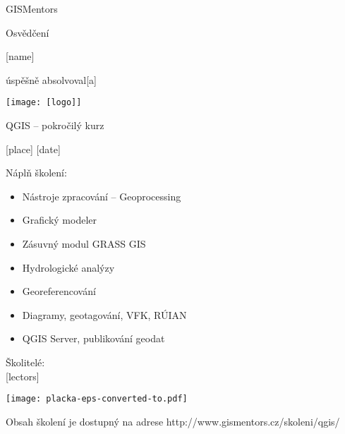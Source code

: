 \documentclass[12pt, a4paper]{letter}
\begin{document}
\pagestyle{empty}
\begin{center}

{\Large GISMentors}

{\Huge Osvědčení}

{\Large [name]}

úspěšně absolvoval[a]

\texttt{[image: [logo]]}

{\Large QGIS -- pokročilý kurz}

[place] [date]
\end{center}

Náplň školení:

\begin{itemize}
    \item Nástroje zpracování -- Geoprocessing
    \item Grafický modeler
    \item Zásuvný modul GRASS GIS
    \item Hydrologické analýzy
    \item Georeferencování
    \item Diagramy, geotagování, VFK, RÚIAN
    \item QGIS Server, publikování geodat
\end{itemize}

\vfill
\parbox{7cm}{

        Školitelé: \\

        [lectors]


}
\hfill
\parbox{3cm}{
    \texttt{[image: placka-eps-converted-to.pdf]}
}


\begin{center}
{\footnotesize Obsah školení je dostupný na adrese
http://www.gismentors.cz/skoleni/qgis/}
\end{center}
\end{document}
